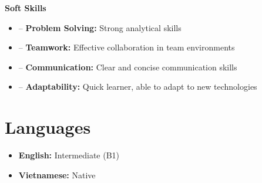 \documentclass[a4paper,12pt]{article}
\newenvironment{itemList}[3][]
    {
    \noindent\hspace{1em}\textbf{#2}\hfill#3\\[3.75pt]
    \begin{minipage}[t]{\linewidth}
    \begin{itemize}[nosep,after=\strut, leftmargin=2em, itemsep=3pt,label={},#1]
    }
    {
    \end{itemize}
    \end{minipage}
    }
\begin{document}
\begin{itemList}[itemsep=5pt]{Soft Skills}{}
    \item -- \textbf{Problem Solving:} Strong analytical skills
    \item -- \textbf{Teamwork:} Effective collaboration in team environments
    \item -- \textbf{Communication:} Clear and concise communication skills
    \item -- \textbf{Adaptability:} Quick learner, able to adapt to new technologies
\end{itemList}

\section{Languages}
\begin{itemize}[nosep,after=\strut, leftmargin=1em, itemsep=4pt, label={}]
    \item \textbf{English:} Intermediate (B1)
    \item \textbf{Vietnamese:} Native
\end{itemize}

\vfill
{}
\end{document}
